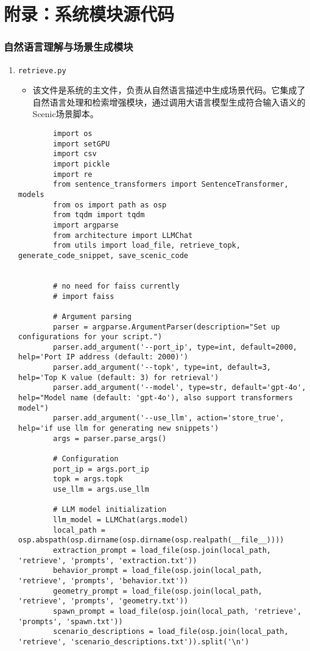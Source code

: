 \chapter{附录：系统模块源代码}

\subsection*{自然语言理解与场景生成模块}
\begin{enumerate}
	\item \texttt{retrieve.py}
	\begin{itemize}
		\item 该文件是系统的主文件，负责从自然语言描述中生成场景代码。它集成了自然语言处理和检索增强模块，通过调用大语言模型生成符合输入语义的Scenic场景脚本。
	\end{itemize}
	\begin{verbatim}
		import os
		import setGPU
		import csv
		import pickle
		import re
		from sentence_transformers import SentenceTransformer, models
		from os import path as osp
		from tqdm import tqdm
		import argparse
		from architecture import LLMChat
		from utils import load_file, retrieve_topk, generate_code_snippet, save_scenic_code
		
		
		# no need for faiss currently
		# import faiss
		
		# Argument parsing
		parser = argparse.ArgumentParser(description="Set up configurations for your script.")
		parser.add_argument('--port_ip', type=int, default=2000, help='Port IP address (default: 2000)')
		parser.add_argument('--topk', type=int, default=3, help='Top K value (default: 3) for retrieval')
		parser.add_argument('--model', type=str, default='gpt-4o', help="Model name (default: 'gpt-4o'), also support transformers model")
		parser.add_argument('--use_llm', action='store_true', help='if use llm for generating new snippets')
		args = parser.parse_args()
		
		# Configuration
		port_ip = args.port_ip
		topk = args.topk
		use_llm = args.use_llm
		
		# LLM model initialization
		llm_model = LLMChat(args.model)
		local_path = osp.abspath(osp.dirname(osp.dirname(osp.realpath(__file__))))
		extraction_prompt = load_file(osp.join(local_path, 'retrieve', 'prompts', 'extraction.txt'))
		behavior_prompt = load_file(osp.join(local_path, 'retrieve', 'prompts', 'behavior.txt'))
		geometry_prompt = load_file(osp.join(local_path, 'retrieve', 'prompts', 'geometry.txt'))
		spawn_prompt = load_file(osp.join(local_path, 'retrieve', 'prompts', 'spawn.txt'))
		scenario_descriptions = load_file(osp.join(local_path, 'retrieve', 'scenario_descriptions.txt')).split('\n')
		

\end{verbatim}
\end{enumerate}
